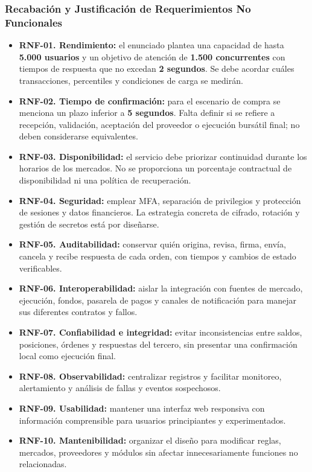 \documentclass[11pt,a4paper,oneside]{article}
\begin{document}
\subsubsection{Recabación y Justificación de Requerimientos No Funcionales}
\begin{itemize}
    \item \textbf{RNF-01. Rendimiento:} el enunciado plantea una capacidad de hasta \textbf{5.000 usuarios} y un objetivo de atención de \textbf{1.500 concurrentes} con tiempos de respuesta que no excedan \textbf{2 segundos}. Se debe acordar cuáles transacciones, percentiles y condiciones de carga se medirán.
    \item \textbf{RNF-02. Tiempo de confirmación:} para el escenario de compra se menciona un plazo inferior a \textbf{5 segundos}. Falta definir si se refiere a recepción, validación, aceptación del proveedor o ejecución bursátil final; no deben considerarse equivalentes.
    \item \textbf{RNF-03. Disponibilidad:} el servicio debe priorizar continuidad durante los horarios de los mercados. No se proporciona un porcentaje contractual de disponibilidad ni una política de recuperación.
    \item \textbf{RNF-04. Seguridad:} emplear MFA, separación de privilegios y protección de sesiones y datos financieros. La estrategia concreta de cifrado, rotación y gestión de secretos está por diseñarse.
    \item \textbf{RNF-05. Auditabilidad:} conservar quién origina, revisa, firma, envía, cancela y recibe respuesta de cada orden, con tiempos y cambios de estado verificables.
    \item \textbf{RNF-06. Interoperabilidad:} aislar la integración con fuentes de mercado, ejecución, fondos, pasarela de pagos y canales de notificación para manejar sus diferentes contratos y fallos.
    \item \textbf{RNF-07. Confiabilidad e integridad:} evitar inconsistencias entre saldos, posiciones, órdenes y respuestas del tercero, sin presentar una confirmación local como ejecución final.
    \item \textbf{RNF-08. Observabilidad:} centralizar registros y facilitar monitoreo, alertamiento y análisis de fallas y eventos sospechosos.
    \item \textbf{RNF-09. Usabilidad:} mantener una interfaz web responsiva con información comprensible para usuarios principiantes y experimentados.
    \item \textbf{RNF-10. Mantenibilidad:} organizar el diseño para modificar reglas, mercados, proveedores y módulos sin afectar innecesariamente funciones no relacionadas.
\end{itemize}
\end{document}
